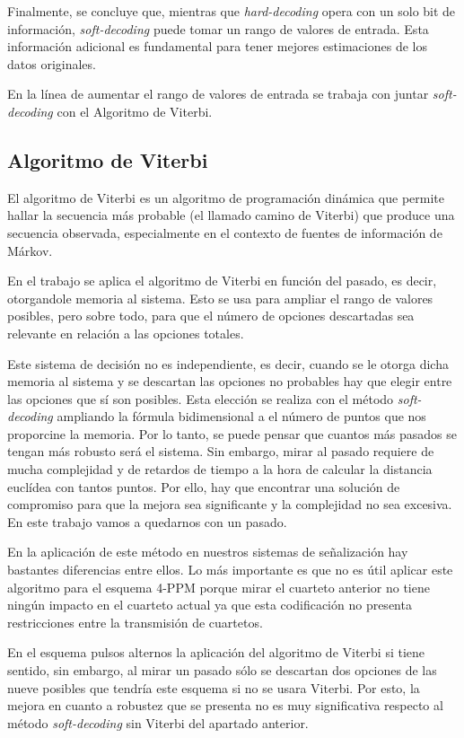 Finalmente, se concluye que, mientras que \textit{hard-decoding} opera con un solo bit de 
información, \textit{soft-decoding} puede tomar un rango de valores de entrada. Esta 
información adicional es fundamental para tener mejores estimaciones de los datos
originales.

En la línea de aumentar el rango de valores de entrada se trabaja con juntar 
\textit{soft-decoding} con el Algoritmo de Viterbi.


\subsection{Algoritmo de Viterbi}
El algoritmo de Viterbi es un algoritmo de programación dinámica que permite hallar 
la secuencia más probable (el llamado camino de Viterbi) que produce 
una secuencia observada, especialmente en el contexto de fuentes de información 
de Márkov.

En el trabajo se aplica el algoritmo de Viterbi en función del pasado, es decir, 
otorgandole memoria al sistema. Esto se usa para ampliar el rango de valores posibles, 
pero sobre todo, para que el número de opciones descartadas sea relevante en relación a
las opciones totales.

Este sistema de decisión no es independiente, es decir, cuando se le otorga dicha 
memoria al sistema y se descartan las opciones no probables hay que elegir entre las
opciones que sí son posibles. Esta elección se realiza con el método 
\textit{soft-decoding} ampliando la fórmula bidimensional a el número de puntos que 
nos proporcine la memoria. Por lo tanto, se puede pensar que cuantos más pasados 
se tengan más robusto será el sistema. Sin embargo, mirar al pasado requiere de mucha
complejidad y de retardos de tiempo a la hora de calcular la distancia euclídea con 
tantos puntos. Por ello, hay que encontrar una solución de compromiso para que la mejora
sea significante y la complejidad no sea excesiva. En este trabajo vamos a quedarnos 
con un pasado.

En la aplicación de este método en nuestros sistemas de señalización hay bastantes 
diferencias entre ellos. Lo más importante es que no es útil aplicar este algoritmo para 
el esquema 4-PPM porque mirar el cuarteto anterior no tiene ningún impacto en el 
cuarteto actual ya que esta codificación no presenta restricciones entre la 
transmisión de cuartetos.

En el esquema pulsos alternos la aplicación del algoritmo de Viterbi si tiene sentido,
sin embargo, al mirar un pasado sólo se descartan dos opciones de las nueve posibles 
que tendría este esquema si no se usara Viterbi. Por esto, la mejora en cuanto a 
robustez que se presenta no es muy significativa respecto al método \textit{soft-decoding}
sin Viterbi del apartado anterior.

